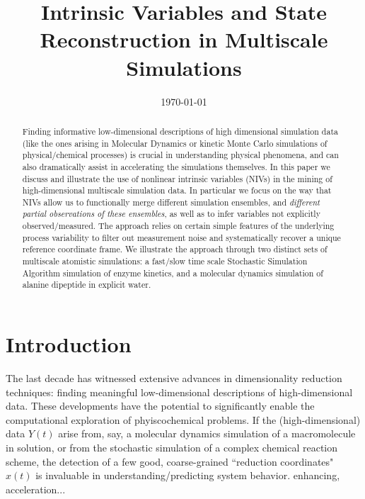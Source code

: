 \documentclass[twocolumn]{revtex4}
\begin{document}
\title{Intrinsic Variables and State Reconstruction in Multiscale Simulations}


\date{\today}

\begin{abstract}
Finding informative low-dimensional descriptions of high dimensional simulation data
(like the ones arising in Molecular Dynamics or kinetic Monte Carlo simulations of
physical/chemical processes) is crucial in understanding physical phenomena, and can
also dramatically assist in accelerating the simulations themselves.
%
In this paper we discuss and illustrate the use of nonlinear intrinsic variables (NIVs)
in the mining of high-dimensional multiscale simulation data.
%
In particular we focus on the way that NIVs allow us to functionally merge different
simulation ensembles, and {\em different partial observations of these ensembles}, as well
as to infer variables not explicitly observed/measured.
%
The approach relies on certain simple features of the underlying process variability to
filter out measurement noise and systematically recover a unique reference coordinate frame.
%
We illustrate the approach through two distinct sets of multiscale atomistic simulations: a fast/slow
time scale Stochastic Simulation Algorithm simulation of enzyme kinetics, and a molecular
dynamics simulation of alanine dipeptide in explicit water.

\end{abstract}


\maketitle

\section{Introduction}
The last decade has witnessed extensive advances in dimensionality reduction techniques:
finding meaningful low-dimensional descriptions of high-dimensional data.
%
These developments have the potential to significantly enable the computational exploration
of phyiscochemical problems.
%
If the (high-dimensional) data $Y(t)$ arise from, say, a
molecular dynamics simulation of a macromolecule in solution, or from the stochastic
simulation of a complex chemical reaction scheme, the detection of a few good, coarse-grained
``reduction coordinates" $x(t)$ is invaluable in understanding/predicting system behavior.
%
enhancing, acceleration...
\end{document}
